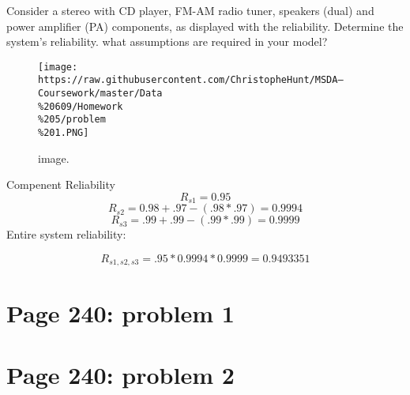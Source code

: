 \documentclass[]{article}
\begin{document}
Consider a stereo with CD player, FM-AM radio tuner, speakers (dual) and
power amplifier (PA) components, as displayed with the reliability.
Determine the system's reliability. what assumptions are required in
your model?

\begin{figure}[htbp]
\centering
\texttt{[image: https://raw.githubusercontent.com/ChristopheHunt/MSDA---Coursework/master/Data\\\%20609/Homework\\\%205/problem\\\%201.PNG]}
\caption{image.}
\end{figure}

Compenent Reliability \[R_{s1} = 0.95\]
\[R_{s2} = 0.98 + .97 - (.98 * .97) = 0.9994\]
\[R_{s3} = .99 + .99 - (.99 * .99) = 0.9999\] Entire system reliability:

\[R_{s1, s2, s3} = .95 * 0.9994 * 0.9999 = 0.9493351\]

\section{Page 240: problem 1}\label{page-240-problem-1}

\section{Page 240: problem 2}\label{page-240-problem-2}
\end{document}

